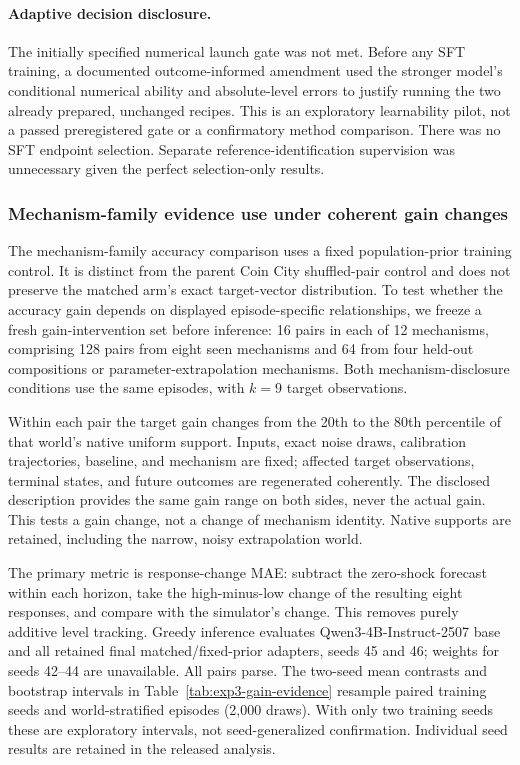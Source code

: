 \paragraph{Adaptive decision disclosure.}
The initially specified numerical launch gate was not met. Before any SFT
training, a documented outcome-informed amendment used the stronger model's
conditional numerical ability and absolute-level errors to justify running the
two already prepared, unchanged recipes. This is an exploratory learnability
pilot, not a passed preregistered gate or a confirmatory method comparison.
There was no SFT endpoint selection. Separate reference-identification
supervision was unnecessary given the perfect selection-only results.

\subsubsection{Mechanism-family evidence use under coherent gain changes}
\label{app:exp3-evidence-use}

The mechanism-family accuracy comparison uses a fixed population-prior training
control. It is distinct from the parent Coin City shuffled-pair control and
does not preserve the matched arm's exact target-vector distribution. To test
whether the accuracy gain depends on displayed episode-specific relationships,
we freeze a fresh gain-intervention set before inference: 16 pairs in each of
12 mechanisms, comprising 128 pairs from eight seen mechanisms and 64 from
four held-out compositions or parameter-extrapolation mechanisms. Both
mechanism-disclosure conditions use the same episodes, with $k=9$ target
observations.

Within each pair the target gain changes from the 20th to the 80th percentile
of that world's native uniform support. Inputs, exact noise draws, calibration
trajectories, baseline, and mechanism are fixed; affected target observations,
terminal states, and future outcomes are regenerated coherently. The disclosed
description provides the same gain range on both sides, never the actual gain.
This tests a gain change, not a change of mechanism identity. Native supports
are retained, including the narrow, noisy extrapolation world.

The primary metric is response-change MAE: subtract the zero-shock forecast
within each horizon, take the high-minus-low change of the resulting eight
responses, and compare with the simulator's change. This removes purely
additive level tracking. Greedy inference evaluates Qwen3-4B-Instruct-2507
base and all retained final matched/fixed-prior adapters, seeds 45 and 46;
weights for seeds 42--44 are unavailable. All pairs parse. The two-seed mean
contrasts and bootstrap intervals in Table~\ref{tab:exp3-gain-evidence} resample
paired training seeds and world-stratified episodes (2,000 draws). With only
two training seeds these are exploratory intervals, not seed-generalized
confirmation. Individual seed results are retained in the released analysis.

